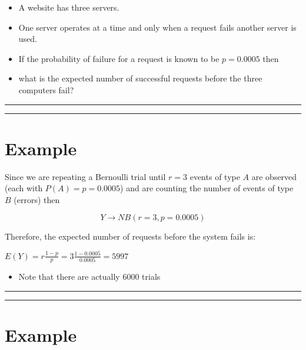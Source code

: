 \documentclass[
]{book}
\providecommand{\tightlist}{%
  \setlength{\itemsep}{0pt}\setlength{\parskip}{0pt}}
\begin{document}
\begin{itemize}
\item
  A website has three servers.
\item
  One server operates at a time and only when a request fails another server is used.
\item
  If the probability of failure for a request is known to be \(p=0.0005\) then
\item
  what is the expected number of successful requests before the three computers fail?
\end{itemize}

\begin{center}\rule{0.5\linewidth}{0.5pt}\end{center}

\begin{center}\rule{0.5\linewidth}{0.5pt}\end{center}

\hypertarget{example-10}{%
\section{Example}\label{example-10}}

Since we are repeating a Bernoulli trial until \(r=3\) events of type \(A\) are observed (each with \(P(A)=p=0.0005\)) and are counting the number of events of type \(B\) (errors) then

\[Y \rightarrow NB(r=3, p=0.0005)\]

Therefore, the expected number of requests before the system fails is:

\(E(Y)=r\frac{1-p}{p}=3\frac{1-0.0005}{0.0005}=5997\)

\begin{itemize}
\tightlist
\item
  Note that there are actually \(6000\) trials
\end{itemize}

\begin{center}\rule{0.5\linewidth}{0.5pt}\end{center}

\begin{center}\rule{0.5\linewidth}{0.5pt}\end{center}

\hypertarget{example-11}{%
\section{Example}\label{example-11}}
\end{document}

